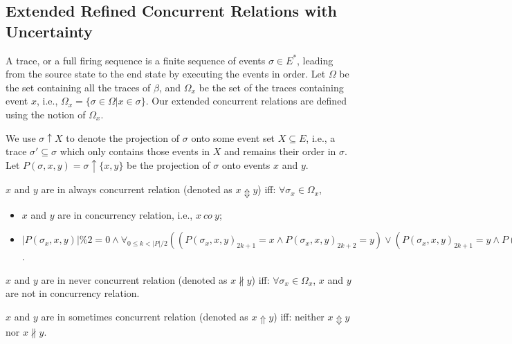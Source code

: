\documentclass[dvips,...]{llncs}
\begin{document}
\subsection{Extended Refined Concurrent Relations with Uncertainty}\label{subsec:concurrent}
A trace, or a full firing sequence is a finite sequence of events $\sigma\in E^{*}$, leading from the source state to the end state by executing the events in order. Let $\Omega$ be the set containing all the traces of $\beta$, and $\Omega_{x}$ be the set of the traces containing event $x$, i.e., $\Omega_{x}=\{\sigma\in\Omega|x\in\sigma\}$. Our extended concurrent relations are defined using the notion of $\Omega_{x}$.

We use $\sigma\uparrow X$ to denote the projection of $\sigma$ onto some event set $X\subseteq E$, i.e., a trace $\sigma'\subseteq\sigma$ which only contains those events in $X$ and remains their order in $\sigma$. Let $P(\sigma,x,y)=\sigma\uparrow\{x,y\}$ be the projection of $\sigma$ onto events $x$ and $y$.

\begin{definition}\label{def:alwaysConcurrent}
$x$ and $y$ are in always concurrent relation (denoted as $x\Updownarrow y$) iff: $\forall\sigma_{x}\in\Omega_{x}$,
	\begin{itemize}
		\item[-] $x$ and $y$ are in concurrency relation, i.e., $x~co~y$;
		\item[-] $|P(\sigma_{x},x,y)|\%2=0\wedge\forall_{0\leq k<|P|/2}((P(\sigma_{x},x,y)_{2k+1}=x\wedge P(\sigma_{x},x,y)_{2k+2}=y)\vee(P(\sigma_{x},x,y)_{2k+1}=y\wedge P(\sigma_{x},x,y)_{2k+2}=x)\vee(P(\sigma_{x},x,y)_{2k+1}=y\wedge P(\sigma_{x},x,y)_{2k+2}=y))$.
	\end{itemize}
\end{definition}

\begin{definition}\label{def:neverConcurrent}
$x$ and $y$ are in never concurrent relation (denoted as $x\nparallel y$) iff: $\forall\sigma_{x}\in\Omega_{x}$, $x$ and $y$ are not in concurrency relation.
\end{definition}

\begin{definition}\label{def:sometimesConcurrent}
$x$ and $y$ are in sometimes concurrent relation (denoted as $x\Uparrow y$) iff: neither $x\Updownarrow y$ nor $x\nparallel y$.
\end{definition}
\end{document}
